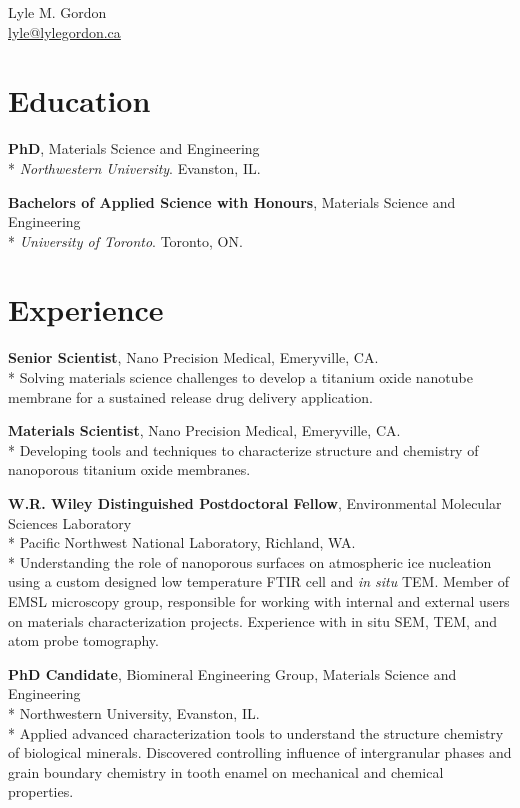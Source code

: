 \begin{center}
{\LARGE Lyle M. Gordon\\[0.3cm]}
\href{mailto:lyle@lylegordon.ca}{lyle@lylegordon.ca}
\end{center}

\section*{Education}
\textbf{PhD}, Materials Science and Engineering\\* 
\emph{Northwestern University}. Evanston, IL.
\begingroup\setlength{\parskip}{0.15cm}

\textbf{Bachelors of Applied Science with Honours}, Materials Science and Engineering\\* 
\emph{University of Toronto}. Toronto, ON.
\endgroup

\section*{Experience}

\textbf{Senior Scientist}, Nano Precision Medical, Emeryville, CA.\\*
\begingroup\setlength{\parskip}{0.2cm}
Solving materials science challenges to develop a titanium oxide nanotube membrane for a sustained release drug delivery application.

\textbf{Materials Scientist}, Nano Precision Medical, Emeryville, CA.\\*
Developing tools and techniques to characterize structure and chemistry of nanoporous titanium oxide membranes.

\textbf{W.R. Wiley Distinguished Postdoctoral Fellow}, Environmental Molecular Sciences Laboratory\\* Pacific Northwest National Laboratory, Richland, WA.\\*
Understanding the role of nanoporous surfaces on atmospheric ice nucleation using a custom designed low temperature FTIR cell and \emph{in situ} TEM. Member of EMSL microscopy group, responsible for working with internal and external users on materials characterization projects. Experience with in situ SEM, TEM, and atom probe tomography.

\textbf{PhD Candidate}, Biomineral Engineering Group, Materials Science and Engineering\\* Northwestern University, Evanston, IL.\\*
Applied advanced characterization tools to understand the structure chemistry of biological minerals. Discovered controlling influence of intergranular phases and grain boundary chemistry in tooth enamel on mechanical and chemical properties.

